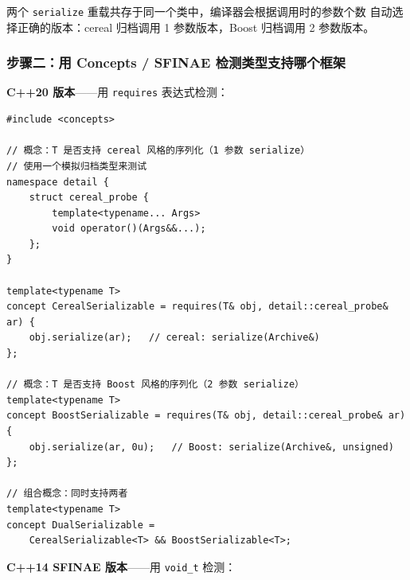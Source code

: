 \documentclass[12pt,a4paper,fontset=fandol]{ctexbook}
\begin{document}
两个 \texttt{serialize} 重载共存于同一个类中，编译器会根据调用时的参数个数
自动选择正确的版本：cereal 归档调用 1 参数版本，Boost 归档调用 2 参数版本。

\subsubsection*{步骤二：用 Concepts / SFINAE 检测类型支持哪个框架}

\textbf{C++20 版本}——用 \texttt{requires} 表达式检测：

\begin{lstlisting}
#include <concepts>

// 概念：T 是否支持 cereal 风格的序列化（1 参数 serialize）
// 使用一个模拟归档类型来测试
namespace detail {
    struct cereal_probe {
        template<typename... Args>
        void operator()(Args&&...);
    };
}

template<typename T>
concept CerealSerializable = requires(T& obj, detail::cereal_probe& ar) {
    obj.serialize(ar);   // cereal: serialize(Archive&)
};

// 概念：T 是否支持 Boost 风格的序列化（2 参数 serialize）
template<typename T>
concept BoostSerializable = requires(T& obj, detail::cereal_probe& ar) {
    obj.serialize(ar, 0u);   // Boost: serialize(Archive&, unsigned)
};

// 组合概念：同时支持两者
template<typename T>
concept DualSerializable =
    CerealSerializable<T> && BoostSerializable<T>;
\end{lstlisting}

\textbf{C++14 SFINAE 版本}——用 \texttt{void\_t} 检测：
\end{document}
